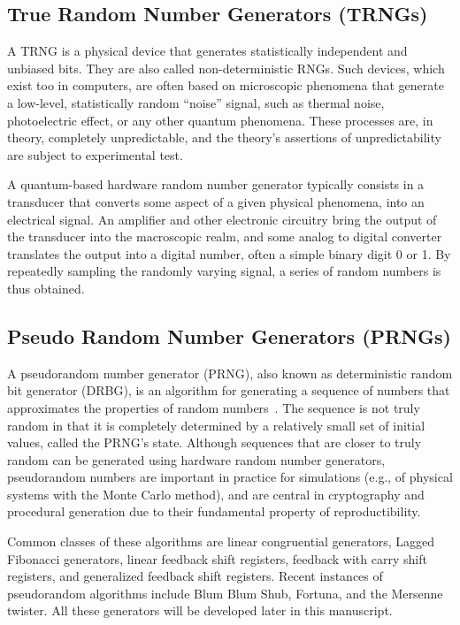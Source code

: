 \subsection{True Random Number Generators (TRNGs)}
A TRNG is a physical device that generates statistically independent and unbiased bits. They are also
called non-deterministic RNGs. Such devices, which
exist too in computers, are often based on microscopic phenomena that generate a low-level, statistically random ``noise'' signal, such as thermal noise, photoelectric effect, or any other quantum phenomena. These processes are, in theory, completely unpredictable, and the theory's assertions of unpredictability are subject to experimental test. 

A quantum-based hardware random number generator typically consists in a transducer that converts some aspect of a given physical phenomena, into an electrical signal. An amplifier and other electronic circuitry bring the output of the transducer into the macroscopic realm, and some analog to digital converter translates the output into a digital number, often a simple binary digit 0 or 1. By repeatedly sampling the randomly varying signal, a series of random numbers is thus obtained.

\subsection{Pseudo Random Number Generators (PRNGs)}

A pseudorandom number generator (PRNG), also known as deterministic random bit generator (DRBG), is an algorithm for generating a sequence of numbers that approximates the properties of random numbers~\cite{Barker05recommendationfor}. The sequence is not truly random in that it is completely determined by a relatively small set of initial values, called the PRNG's state. Although sequences that are closer to truly random can be generated using hardware random number generators, pseudorandom numbers are important in practice for simulations (e.g., of physical systems with the Monte Carlo method), and are central in   cryptography and procedural generation due to their fundamental property of reproductibility. 

Common classes of these algorithms are linear congruential generators, Lagged Fibonacci generators, linear feedback shift registers, feedback with carry shift registers, and generalized feedback shift registers. Recent instances of pseudorandom algorithms include Blum Blum Shub, Fortuna, and the Mersenne twister.
All these generators will be developed later in this manuscript.

